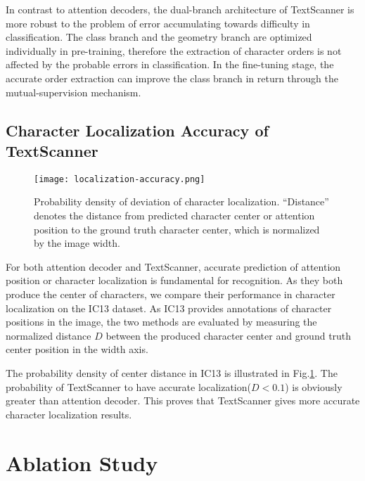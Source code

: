 \documentclass[letterpaper]{article} \usepackage{aaai20}  \usepackage{times}  \usepackage{helvet} \usepackage{courier}  \usepackage[hyphens]{url}  \usepackage{graphicx} \urlstyle{rm} \def\UrlFont{\rm}  \usepackage{graphicx}  \frenchspacing  \setlength{\pdfpagewidth}{8.5in}  \setlength{\pdfpageheight}{11in}
\begin{document}
In contrast to attention decoders, the dual-branch architecture of TextScanner is more robust to the problem of error accumulating towards difficulty in classification. The class branch and the geometry branch are optimized individually in pre-training, therefore the extraction of character orders is not affected by the probable errors in classification. In the fine-tuning stage, the accurate order extraction can improve the class branch in return through the mutual-supervision mechanism.

\subsection{Character Localization Accuracy of TextScanner}

\begin{figure}[t]
\centering
\texttt{[image: localization-accuracy.png]}
\caption{Probability density of deviation of character localization. ``Distance'' denotes the distance from predicted character center or attention position to the ground truth character center, which is normalized by the image width.}
\label{fig:localization}
\end{figure}

For both attention decoder and TextScanner, accurate prediction of attention position or character localization is fundamental for recognition. As they both produce the center of characters, we compare their performance in character localization on the IC13 dataset. As IC13 provides annotations of character positions in the image, the two methods are evaluated by measuring the normalized distance $D$ between the produced character center and ground truth center position in the width axis.

The probability density of center distance in IC13 is illustrated in Fig.\ref{fig:localization}. The probability of TextScanner to have accurate localization($D < 0.1$) is obviously greater than attention decoder. This proves that TextScanner gives more accurate character localization results.

\section{Ablation Study}
\end{document}

